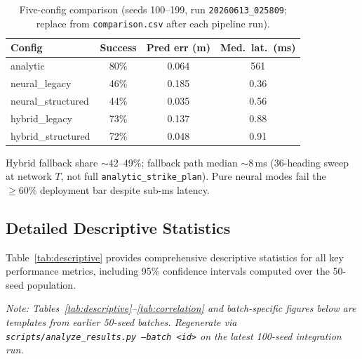 \documentclass[10pt,twocolumn,letterpaper]{article}
\begin{document}
\begin{table}[H]
\centering
\caption{Five-config comparison (seeds 100--199, run \texttt{20260613\_025809}; replace from \texttt{comparison.csv} after each pipeline run).}
\label{tab:results}
\begin{tabular}{@{}lccc@{}}
\toprule
\textbf{Config} & \textbf{Success} & \textbf{Pred err (m)} & \textbf{Med.\ lat.\ (ms)} \\ \midrule
analytic & 80\% & 0.064 & 561 \\
neural\_legacy & 46\% & 0.185 & 0.36 \\
neural\_structured & 44\% & 0.035 & 0.56 \\
hybrid\_legacy & 73\% & 0.137 & 0.88 \\
hybrid\_structured & 72\% & 0.048 & 0.91 \\
\bottomrule
\end{tabular}
\end{table}

Hybrid fallback share ${\sim}42$--49\%; fallback path median ${\sim}8$\,ms
(36-heading sweep at network $T$, not full \texttt{analytic\_strike\_plan}).
Pure neural modes fail the ${\ge}60\%$ deployment bar despite sub-ms latency.

\subsection{Detailed Descriptive Statistics}

Table~\ref{tab:descriptive} provides comprehensive descriptive
statistics for all key performance metrics, including 95\% confidence
intervals computed over the 50-seed population.

\textit{Note: Tables~\ref{tab:descriptive}--\ref{tab:correlation} and
batch-specific figures below are templates from earlier 50-seed batches.
Regenerate via \texttt{scripts/analyze\_results.py --batch <id>} on the
latest 100-seed integration run.}
\end{document}
